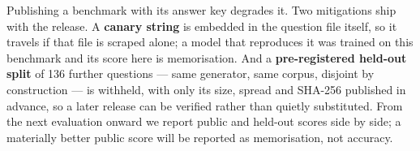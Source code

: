 \documentclass[10pt,a4paper]{article}
\begin{document}
Publishing a benchmark with its answer key degrades it. Two mitigations ship with the release. A \textbf{canary string} is embedded in the question file itself, so it travels if that file is scraped alone; a model that reproduces it was trained on this benchmark and its score here is memorisation. And a \textbf{pre-registered held-out split} of 136 further questions --- same generator, same corpus, disjoint by construction --- is withheld, with only its size, spread and SHA-256 published in advance, so a later release can be verified rather than quietly substituted. From the next evaluation onward we report public and held-out scores side by side; a materially better public score will be reported as memorisation, not accuracy.
\end{document}
